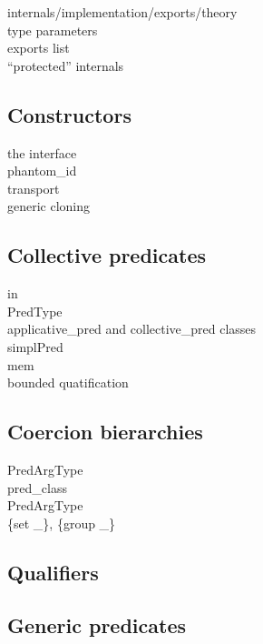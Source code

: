 internals/implementation/exports/theory\\
type parameters\\
exports list\\
``protected'' internals

\subsection{Constructors}

the interface\\
phantom\_id\\
transport\\
generic cloning

\mcbPROVIDE{\\in}

\subsection{Collective predicates}
in\\
PredType\\
applicative_pred and collective_pred classes\\
simplPred\\
mem\\
bounded quatification

\subsection{Coercion bierarchies}

PredArgType\\
pred\_class\\
PredArgType\\
\{set \_\}, \{group \_\}

\subsection{Qualifiers}
\subsection{Generic predicates}


